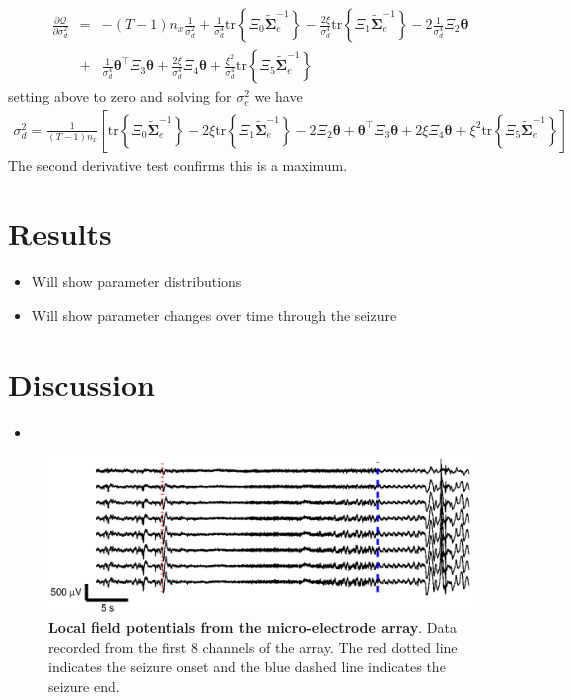 \documentclass[]{article}
\begin{document}
\begin{eqnarray}
 \frac{\partial \mathcal Q}{\partial \sigma_d^2}&=& -(T-1)n_x\frac{1}{\sigma_d^2}+\frac{1}{\sigma_d^4}\mathrm{tr}\left\lbrace \Xi_0 \tilde{\boldsymbol\Sigma}_e^{-1}\right\rbrace-\frac{2\xi}{\sigma_d^4} \mathrm{tr}\left\lbrace \Xi_1 \tilde{\boldsymbol\Sigma}_e^{-1}\right\rbrace -2\frac{1}{\sigma_d^4}\Xi_2\boldsymbol\theta \nonumber \\
&+&\frac{1}{\sigma_d^4}\boldsymbol\theta^\top \Xi_3\boldsymbol\theta+\frac{2\xi}{\sigma_d^4} \Xi_4 \boldsymbol\theta +\frac{\xi^2}{\sigma_d^4}\mathrm{tr} \left\lbrace\Xi_5\tilde{\boldsymbol\Sigma}_e^{-1} \right\rbrace 
\end{eqnarray}
setting above to zero and solving for $\sigma_e^2$ we have
\begin{eqnarray}
\sigma_d^2=\frac{1}{(T-1)n_x}\left[ \mathrm{tr}\left\lbrace \Xi_0 \tilde{\boldsymbol\Sigma}_e^{-1}\right\rbrace-
2\xi\mathrm{tr}\left\lbrace \Xi_1 \tilde{\boldsymbol\Sigma}_e^{-1}\right\rbrace -2\Xi_2\boldsymbol\theta+\boldsymbol\theta^\top \Xi_3\boldsymbol\theta+2\xi\Xi_4 \boldsymbol\theta +\xi^2\mathrm{tr} \left\lbrace\Xi_5\tilde{\boldsymbol\Sigma}_e^{-1} \right\rbrace \right]  
\end{eqnarray}
The second derivative test confirms this is a maximum.

\section{Results}
\begin{itemize}
	\item Will show parameter distributions
	\item Will show parameter changes over time through the seizure
\end{itemize}

\section{Discussion}

\begin{itemize}
	\item  
\end{itemize}

\begin{figure}[!ht]
\begin{center}
\includegraphics{./Figures/LFPs.eps}
\end{center}
\caption{{\bf Local field potentials from the micro-electrode array}. Data recorded from the first 8 channels of the array. The red dotted line indicates the seizure onset and the blue dashed line indicates the seizure end.}
\label{fig:TimeSeries}
\end{figure}
\end{document}
